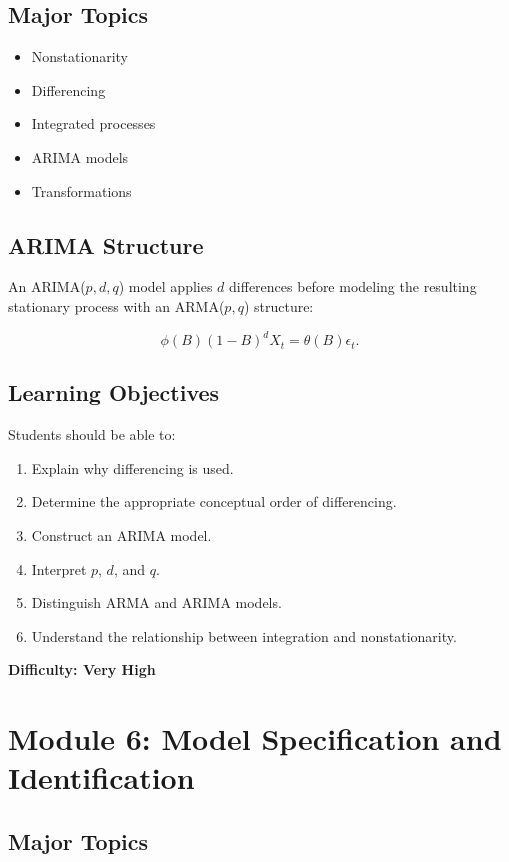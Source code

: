 \documentclass[11pt]{article}
\begin{document}
\subsection{Major Topics}

\begin{itemize}
    \item Nonstationarity
    \item Differencing
    \item Integrated processes
    \item ARIMA models
    \item Transformations
\end{itemize}

\subsection{ARIMA Structure}

An ARIMA($p,d,q$) model applies $d$ differences before modeling
the resulting stationary process with an ARMA($p,q$) structure:

\[
\phi(B)(1-B)^dX_t
=
\theta(B)\epsilon_t.
\]

\subsection{Learning Objectives}

Students should be able to:

\begin{enumerate}
    \item Explain why differencing is used.
    \item Determine the appropriate conceptual order of differencing.
    \item Construct an ARIMA model.
    \item Interpret $p$, $d$, and $q$.
    \item Distinguish ARMA and ARIMA models.
    \item Understand the relationship between integration and nonstationarity.
\end{enumerate}

\textbf{Difficulty: Very High}

\section{Module 6: Model Specification and Identification}

\subsection{Major Topics}
\end{document}
